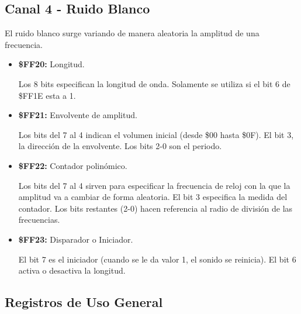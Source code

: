 \subsection{Canal 4 - Ruido Blanco}

	El ruido blanco surge variando de manera aleatoria la amplitud de una frecuencia.
	
	\begin{itemize}
		\item \textbf{\$FF20:} Longitud.
		
		Los 8 bits especifican la longitud de onda. Solamente se utiliza si el bit 6 de \$FF1E esta a 1.		
		
		\item \textbf{\$FF21:} Envolvente de amplitud.
		
		Los bits del 7 al 4 indican el volumen inicial (desde \$00 hasta \$0F). El bit 3, la dirección de la envolvente. Los bits 2-0 son el periodo.			
		
		\item \textbf{\$FF22:} Contador polinómico.
		
		Los bits del 7 al 4 sirven para especificar la frecuencia de reloj con la que la amplitud va a cambiar de forma aleatoria. El bit 3 especifica la medida del contador. Los bits restantes (2-0) hacen referencia al radio de división de las frecuencias.
		
		\item \textbf{\$FF23:} Disparador o Iniciador.
		
		El bit 7 es el iniciador (cuando se le da valor 1, el sonido se reinicia). El bit 6 activa o desactiva la longitud.
		
	\end{itemize}
	
\subsection{Registros de Uso General}
	
